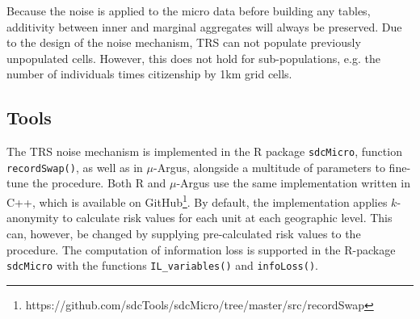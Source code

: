 \noindent Because the noise is applied to the micro data before building any tables, additivity between inner and marginal aggregates will always be preserved.
Due to the design of the noise mechanism, TRS can not populate previously unpopulated cells. However, this does not hold for sub-populations, e.g. the number of individuals times citizenship by 1km grid cells.  

\subsection{Tools}\label{sec:trstools}

The TRS noise mechanism is implemented in the R package \texttt{sdcMicro}, function \texttt{recordSwap()}, as well as in $\mu$-Argus, alongside a multitude of parameters to fine-tune the procedure. Both R and $\mu$-Argus use the same implementation written in C++, which is available on GitHub\footnote{
    https://github.com/sdcTools/sdcMicro/tree/master/src/recordSwap}.
By default, the implementation applies $k$-anonymity to calculate risk values for each unit at each geographic level. This can, however, be changed by supplying pre-calculated risk values to the procedure.
The computation of information loss is supported in the R-package \texttt{sdcMicro} with the functions \texttt{IL\_variables()} and \texttt{infoLoss()}.   

\newpage
